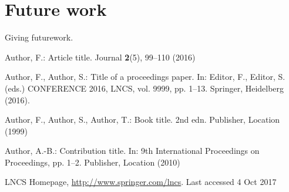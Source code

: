 \documentclass[runningheads]{llncs}
\begin{document}
\section{Future work}
\label{rsc:futurework}
Giving futurework.

%
%
%
%
%
% 
% 
%
\begin{thebibliography}{8}
Author, F.: Article title. Journal \textbf{2}(5), 99--110 (2016)

Author, F., Author, S.: Title of a proceedings paper. In: Editor,
F., Editor, S. (eds.) CONFERENCE 2016, LNCS, vol. 9999, pp. 1--13.
Springer, Heidelberg (2016). 

Author, F., Author, S., Author, T.: Book title. 2nd edn. Publisher,
Location (1999)

Author, A.-B.: Contribution title. In: 9th International Proceedings
on Proceedings, pp. 1--2. Publisher, Location (2010)

LNCS Homepage, \url{http://www.springer.com/lncs}. Last accessed 4
Oct 2017
\end{thebibliography}
\end{document}
